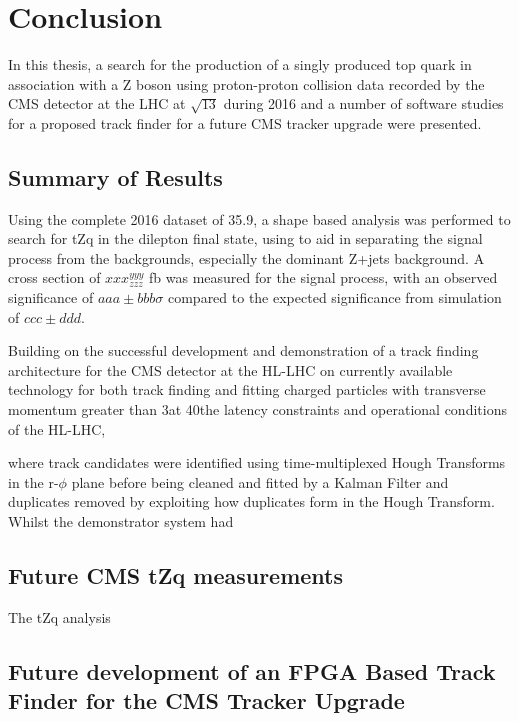 \chapter{Conclusion}\label{chapter:conclusion}

In this thesis, a search for the production of a singly produced top quark in association with a Z boson using proton-proton collision data recorded by the CMS detector at the LHC at $\sqrt{13}$ during 2016 and a number of software studies for a proposed track finder for a future CMS tracker upgrade were presented.

\section{Summary of Results}
Using the complete 2016 dataset of 35.9\fbinv, a shape based analysis was performed to search for tZq in the dilepton final state, using  to aid in separating the signal process from the backgrounds, especially the dominant Z+jets background.
A cross section of $xxx^{yyy}_{zzz}$ fb was measured for the signal process, with an observed significance of $aaa \pm bbb \sigma$ compared to the expected significance from simulation of $ccc \pm ddd$. 


Building on the successful development and demonstration of a track finding architecture for the CMS detector at the HL-LHC on currently available technology for both track finding and fitting charged particles with transverse momentum greater than 3\GeV at 40\MHz the latency constraints and operational conditions of the HL-LHC, 


where track candidates were identified using time-multiplexed Hough Transforms in the r-$\phi$ plane before being cleaned and fitted by a Kalman Filter and duplicates removed by exploiting how duplicates form in the Hough Transform. 
Whilst the demonstrator system had 

\section{Future CMS tZq measurements}
The tZq analysis

\section{Future development of an FPGA Based Track Finder for the CMS Tracker Upgrade}
